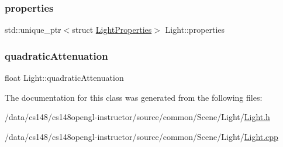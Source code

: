 \hypertarget{class_light_a74eba4cac1cc27e741230fbda32fceef}{}\label{class_light_a74eba4cac1cc27e741230fbda32fceef} 
\subsubsection{\texorpdfstring{properties}{properties}}
{\footnotesize\ttfamily std\+::unique\+\_\+ptr$<$struct \hyperlink{struct_light_properties}{Light\+Properties}$>$ Light\+::properties\hspace{0.3cm}{\ttfamily [private]}}

\hypertarget{class_light_a0f24dde11cbbd12d0f0309e189f3640c}{}\label{class_light_a0f24dde11cbbd12d0f0309e189f3640c} 
\subsubsection{\texorpdfstring{quadratic\+Attenuation}{quadraticAttenuation}}
{\footnotesize\ttfamily float Light\+::quadratic\+Attenuation\hspace{0.3cm}{\ttfamily [private]}}



The documentation for this class was generated from the following files\+:\begin{DoxyCompactItemize}
\item 
/data/cs148/cs148opengl-\/instructor/source/common/\+Scene/\+Light/\hyperlink{_light_8h}{Light.\+h}\item 
/data/cs148/cs148opengl-\/instructor/source/common/\+Scene/\+Light/\hyperlink{_light_8cpp}{Light.\+cpp}\end{DoxyCompactItemize}
